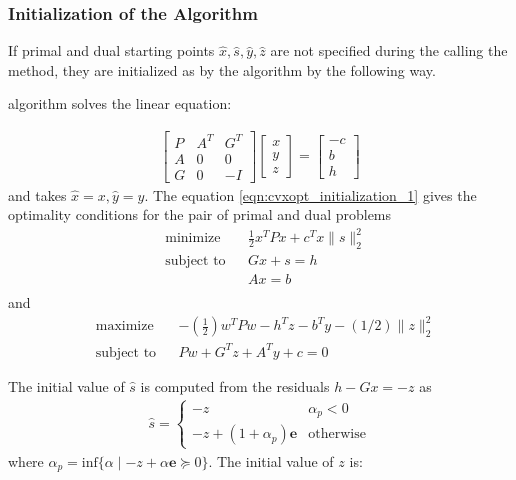 \subsubsection*{Initialization of the Algorithm}
If primal and dual starting points $\hat{x},\hat{s},\hat{y},\hat{z}$ are not specified during the calling the method,  they are initialized as by the algorithm by the following way.

 algorithm solves the linear equation:

\begin{equation}
	\begin{aligned}
		\begin{bmatrix}
			P & A^T & G^T\\
			A & 0 & 0\\
			G & 0 & -I
		\end{bmatrix}
		\begin{bmatrix}
			x\\
			y\\
			z
		\end{bmatrix}
		=
		\begin{bmatrix}
			-c\\
			b\\
			h
		\end{bmatrix}
	\end{aligned}
	\label{eqn:cvxopt_initialization_1}
\end{equation}
and takes $\hat{x} = x, \hat{y}=y$. The equation \ref{eqn:cvxopt_initialization_1} gives the optimality conditions for the pair of primal and dual problems
\begin{equation*}
\begin{aligned}
& \text{minimize}
& & \frac{1}{2}x^{T}Px+c^{T}x\parallel s\parallel_2^2 \\
& \text{subject to} & &  Gx + s = h\\
& & &  Ax = b\\
\end{aligned}
\label{eqn:CVXOPT_qp_1}
\end{equation*}
and
\begin{equation*}
	\begin{aligned}
		& \text{maximize}
& & -(\frac{1}{2})w^TPw-h^Tz-b^Ty-(1/2)\parallel z \parallel_2^2 \\
& \text{subject to} & &  Pw+G^Tz+A^Ty+c=0
	\end{aligned}
	\label{eqn:CVXOPT_qp_2}
\end{equation*}

The initial value of $\hat{s}$ is computed from the residuals $h-Gx=-z$ as
\begin{equation*}
	\begin{aligned}
		\hat{s} = 
		\left\{
                \begin{array}{ll}
                  -z & \alpha_p <0 \\
                  -z+(1+\alpha_p)\textbf{e} & \text{otherwise}
                \end{array}
              \right.
	\end{aligned}
\end{equation*}
where $\alpha_p=\text{inf}\lbrace \alpha\mid-z+\alpha\textbf{e}\succeq 0 \rbrace$. The initial value of $z$ is:

